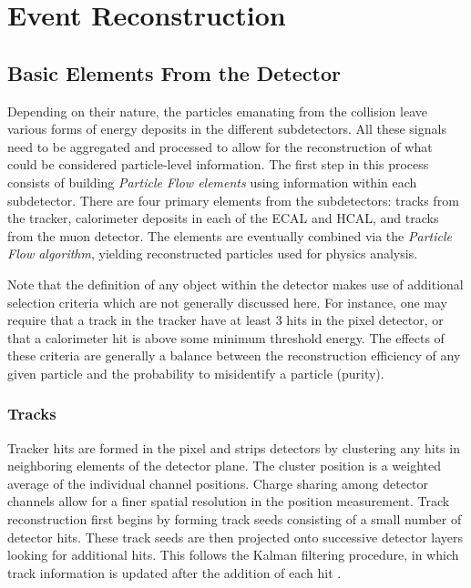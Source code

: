 \chapter{Event Reconstruction}
\label{chap:eventreco}

\section{Basic Elements From the Detector} 

Depending on their nature, the particles emanating from the collision leave various forms of energy deposits in the different subdetectors. All these signals need to be aggregated and processed to allow for the reconstruction of what could be considered particle-level information. The first step in this process consists of building \textit{Particle Flow elements} using information within each subdetector. There are four primary elements from the subdetectors: tracks from the tracker, calorimeter deposits in each of the ECAL and HCAL, and tracks from the muon detector. The elements are eventually combined via the \textit{Particle Flow algorithm}, yielding reconstructed particles used for physics analysis.

Note that the definition of any object within the detector makes use of additional selection criteria which are not generally discussed here. For instance, one may require that a track in the tracker have at least 3 hits in the pixel detector, or that a calorimeter hit is above some minimum threshold energy. The effects of these criteria are generally a balance between the reconstruction efficiency of any given particle and the probability to misidentify a particle (purity).

\subsection{Tracks}%

Tracker hits are formed in the pixel and strips detectors by clustering any hits in neighboring elements of the detector plane. The cluster position is a weighted average of the individual channel positions. Charge sharing among detector channels allow for a finer spatial resolution in the position measurement. Track reconstruction first begins by forming track seeds consisting of a small number of detector hits. These track seeds are then projected onto successive detector layers looking for additional hits. This follows the Kalman filtering procedure, in which track information is updated after the addition of each hit \cite{trackerreco}.
 
